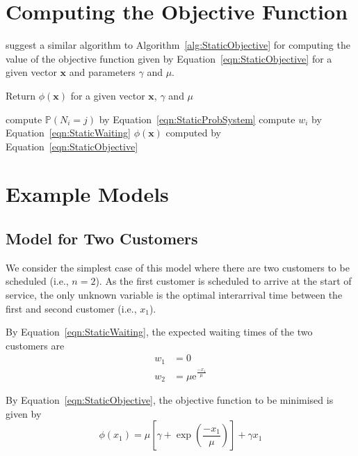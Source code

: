 \section{Computing the Objective Function}
\citet{Pegden} suggest a similar algorithm to Algorithm~\ref{alg:StaticObjective} for computing the value of the objective function given by Equation~\ref{eqn:StaticObjective} for a given vector $\mathbf{x}$ and parameters $\gamma$ and $\mu$.
\begin{algorithm}[htb]
\caption{Return $\phi (\mathbf{x})$ for a given vector $\mathbf{x}$, $\gamma$ and $\mu$}
\begin{algorithmic}
    		\State compute $\mathbb{P} (N_{i} = j)$ by Equation~\ref{eqn:StaticProbSystem}
    	\EndFor
    \EndFor
    	\State compute $w_{i}$ by Equation~\ref{eqn:StaticWaiting}
    \EndFor
    \State \Return $\phi (\mathbf{x})$ computed by Equation~\ref{eqn:StaticObjective}
\EndFunction
\end{algorithmic}
\label{alg:StaticObjective}
\end{algorithm}

\section{Example Models}
\subsection{Model for Two Customers}
\label{sec:StaticTwoCust}
We consider the simplest case of this model where there are two customers to be scheduled (i.e., $n = 2$). As the first customer is scheduled to arrive at the start of service, the only unknown variable is the optimal interarrival time between the first and second customer (i.e., $x_{1}$).

By Equation~\ref{eqn:StaticWaiting}, the expected waiting times of the two customers are
\begin{align}
	w_{1} & = 0 \\
	w_{2} & = \mu \mathrm{e}^{\frac{- x_{1}}{\mu}}
\end{align}

By Equation~\ref{eqn:StaticObjective}, the objective function to be minimised is given by
\begin{equation}
	\phi (x_{1}) = \mu \left[ \gamma + \exp \left( \frac{- x_{1}}{\mu} \right) \right] + \gamma x_{1}
\end{equation}

